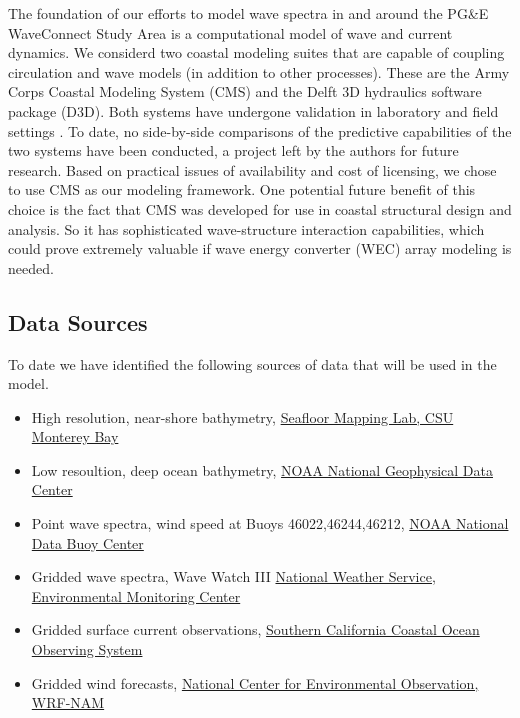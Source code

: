\documentclass[11pt,letterpaper,oneside,reqno]{article}
\begin{document}
The foundation of our efforts to model wave spectra in and around
the PG\&E WaveConnect Study Area is a computational model of wave
and current dynamics. We considerd two coastal modeling suites that
are capable of coupling circulation and wave models (in addition to
other processes). These are the Army Corps Coastal Modeling System
(CMS) and the Delft 3D hydraulics software package (D3D). Both
systems have undergone validation in laboratory and field settings
\citep{lin2008}\citep{gerritsen2008}. To date, no side-by-side comparisons of
the predictive capabilities of the two systems have been conducted,
a project left by the authors for future research. Based on
practical issues of availability and cost of licensing, we chose to
use CMS as our modeling framework. One potential future benefit of
this choice is the fact that CMS was developed for use in coastal
structural design and analysis. So it has sophisticated
wave-structure interaction capabilities, which could prove
extremely valuable if wave energy converter (WEC) array modeling is
needed.

\subsection{Data Sources}

To date we have identified the following sources of data that will
be used in the model.

\begin{itemize}
\item
  High resolution, near-shore bathymetry,
  \href{http://seafloor.csumb.edu/SFMLwebDATA_SURVEYMAP.htm}{Seafloor Mapping Lab, CSU Monterey Bay}
\item
  Low resoultion, deep ocean bathymetry,
  \href{http://www.ngdc.noaa.gov/mgg/geodas/geodas.html}{NOAA National Geophysical Data Center}
\item
  Point wave spectra, wind speed at Buoys 46022,46244,46212,
  \href{http://www.ndbc.noaa.gov}{NOAA National Data Buoy Center}
\item
  Gridded wave spectra, Wave Watch III
  \href{http://polar.ncep.noaa.gov/waves/index2.shtml}{National Weather Service, Environmental Monitoring Center}
\item
  Gridded surface current observations,
  \href{http://www.sccoos.org/data/hfrnet/oi.php}{Southern California Coastal Ocean Observing System}
\item
  Gridded wind forecasts,
  \href{http://www.nco.ncep.noaa.gov/pmb/nwprod/analysis/}{National Center for Environmental Observation, WRF-NAM}
\end{itemize}
\end{document}
